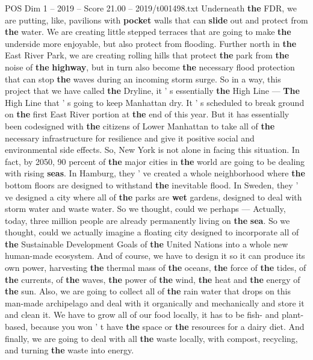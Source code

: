 \begin{textsample}{POS Dim 1 – 2019 – Score 21.00 – 2019/t001498.txt}
Underneath \textbf{the} FDR, we are putting, like, pavilions with \textbf{pocket} walls that can \textbf{slide} out and protect from \textbf{the} water.
We are creating little stepped terraces that are going to make \textbf{the} underside more enjoyable, but also protect from flooding.
Further north in \textbf{the} East River Park, we are creating rolling hills that protect \textbf{the} park from \textbf{the} noise of \textbf{the} \textbf{highway}, but in turn also become \textbf{the} necessary flood protection that can stop \textbf{the} waves during an incoming storm surge.
So in a way, this project that we have called \textbf{the} Dryline, it ' s essentially \textbf{the} High Line — \textbf{The} High Line that ' s going to keep Manhattan dry.
It ' s scheduled to break ground on \textbf{the} first East River portion at \textbf{the} end of this year.
But it has essentially been codesigned with \textbf{the} citizens of Lower Manhattan to take all of \textbf{the} necessary infrastructure for resilience and give it positive social and environmental side effects.
So, New York is not alone in facing this situation.
In fact, by 2050, 90 percent of \textbf{the} major cities in \textbf{the} world are going to be dealing with rising \textbf{seas}.
In Hamburg, they ' ve created a whole neighborhood where \textbf{the} bottom floors are designed to withstand \textbf{the} inevitable flood.
In Sweden, they ' ve designed a city where all of \textbf{the} parks are \textbf{wet} gardens, designed to deal with storm water and waste water.
So we thought, could we perhaps — Actually, today, three million people are already permanently living on \textbf{the} \textbf{sea}.
So we thought, could we actually imagine a floating city designed to incorporate all of \textbf{the} Sustainable Development Goals of \textbf{the} United Nations into a whole new human-made ecosystem.
And of course, we have to design it so it can produce its own power, harvesting \textbf{the} thermal mass of \textbf{the} oceans, \textbf{the} force of \textbf{the} tides, of \textbf{the} currents, of \textbf{the} waves, \textbf{the} power of \textbf{the} wind, \textbf{the} heat and \textbf{the} energy of \textbf{the} sun.
Also, we are going to collect all of \textbf{the} rain water that drops on this man-made archipelago and deal with it organically and mechanically and store it and clean it.
We have to grow all of our food locally, it has to be fish- and plant-based, because you won ' t have \textbf{the} space or \textbf{the} resources for a dairy diet.
And finally, we are going to deal with all \textbf{the} waste locally, with compost, recycling, and turning \textbf{the} waste into energy.

\end{textsample}
